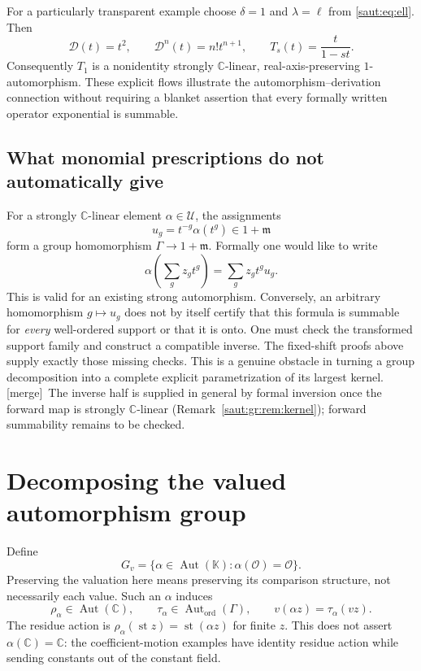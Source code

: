 \documentclass[11pt]{article}
\theoremstyle{definition}
\theoremstyle{remark}
\newcommand{\C}{\mathbb C}
\newcommand{\K}{\mathbb K}
\newcommand{\OO}{\mathcal O}
\newcommand{\mm}{\mathfrak m}
\newcommand{\U}{\mathcal U}
\newcommand{\Aut}{\operatorname{Aut}}
\newcommand{\st}{\operatorname{st}}
\newcommand{\Gh}{\operatorname{Aut}_{\mathrm{ord}}(\Gamma)}
\newcommand{\mergetag}{\textup{[merge]}}
\numberwithin{equation}{section}
\begin{document}
For a particularly transparent example choose $\delta=1$ and $\lambda=\ell$
from \eqref{saut:eq:ell}. Then
\[
 \mathcal D(t)=t^2,\qquad \mathcal D^n(t)=n!t^{n+1},\qquad
 T_s(t)=\frac{t}{1-st}.
\]
Consequently $T_1$ is a nonidentity strongly $\C$-linear, real-axis-preserving
$1$-automorphism. These explicit flows illustrate the automorphism--derivation
connection without requiring a blanket assertion that every formally
written operator exponential is summable.

\subsection{What monomial prescriptions do not automatically give}

For a strongly $\C$-linear element $\alpha\in\U$, the assignments
\[
 u_g=t^{-g}\alpha(t^g)\in1+\mm
\]
form a group homomorphism $\Gamma\to1+\mm$. Formally one would like to write
\[
 \alpha\left(\sum_g z_gt^g\right)=\sum_g z_gt^g u_g.
\]
This is valid for an existing strong automorphism. Conversely, an arbitrary
homomorphism $g\mapsto u_g$ does not by itself certify that this formula is
summable for \emph{every} well-ordered support or that it is onto.
One must check the transformed support family and construct a compatible
inverse. The fixed-shift proofs above supply exactly those missing checks.
This is a genuine obstacle in turning a group decomposition into a complete
explicit parametrization of its largest kernel. \mergetag\ The inverse half is
supplied in general by formal inversion once the forward map is strongly
$\C$-linear (Remark~\ref{saut:gr:rem:kernel}); forward summability remains to be
checked.

\section{Decomposing the valued automorphism group}\label{saut:sec:decomposition}

Define
\[
 G_v=\{\alpha\in\Aut(\K):\alpha(\OO)=\OO\}.
\]
Preserving the valuation here means preserving its comparison structure,
not necessarily each value. Such an $\alpha$ induces
\[
 \rho_\alpha\in\Aut(\C),\qquad
 \tau_\alpha\in\Gh,
 \qquad
 v(\alpha z)=\tau_\alpha(vz).
\]
The residue action is $\rho_\alpha(\st z)=\st(\alpha z)$ for finite $z$.
This does not assert $\alpha(\C)=\C$: the coefficient-motion examples have
identity residue action while sending constants out of the constant field.
\end{document}
